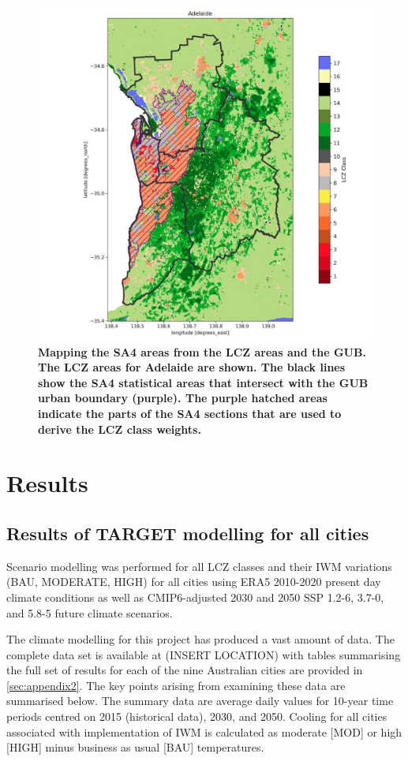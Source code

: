 \documentclass[final,3p,times,authoryear]{elsarticle}
\begin{document}
\begin{figure}
\centering
\includegraphics[trim={0 0 0 0},clip,scale=0.25]{images/image6.jpg}
\caption{\bf Mapping the SA4 areas from the LCZ areas and the GUB.  The LCZ areas for Adelaide are shown. The black lines show the SA4 statistical areas that intersect with the GUB urban boundary (purple). The purple hatched areas indicate the parts of the SA4 sections that are used to derive the LCZ class weights.}
 \label{fig:sa4maps}
\end{figure}

\section{Results}\label{sec:results}
\subsection{Results of TARGET modelling for all cities}\label{sec:results1}

Scenario modelling was performed for all LCZ classes and their IWM variations (BAU, MODERATE, HIGH) for all cities using ERA5 2010-2020 present day climate conditions as well as CMIP6-adjusted 2030 and 2050 SSP 1.2-6, 3.7-0, and 5.8-5 future climate scenarios. 

The climate modelling for this project has produced a vast amount of data.  The complete data set is available at (INSERT LOCATION) with tables summarising the full set of results for each of the nine Australian cities are provided in \ref{sec:appendix2}. The key points arising from examining these data are summarised below. The summary data are average daily values for 10-year time periods centred on 2015 (historical data), 2030, and 2050. Cooling for all cities associated with implementation of IWM is calculated as moderate [MOD] or high [HIGH] minus business as usual [BAU] temperatures.
\end{document}
